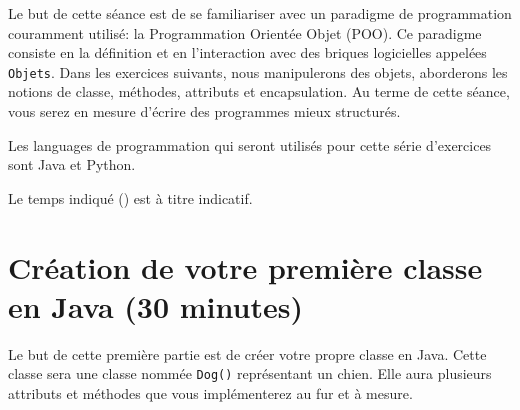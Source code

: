




\ShowSolutiontrue
\ShowConseiltrue
\titre
{}

Le but de cette séance est de se familiariser avec un paradigme de programmation couramment utilisé: la Programmation Orientée Objet (POO). Ce paradigme consiste en la définition et en l'interaction avec des briques logicielles appelées \lstinline{Objets}. Dans les exercices suivants, nous manipulerons des objets, aborderons les notions de classe, méthodes, attributs et encapsulation. Au terme de cette séance, vous serez en mesure d'écrire des programmes mieux structurés.

Les languages de programmation qui seront utilisés pour cette série d'exercices sont Java et Python.

Le temps indiqué (\faClock) est à titre indicatif.

\section{Création de votre première classe en Java (30 minutes)}

Le but de cette première partie est de créer votre propre classe en Java. Cette classe sera une classe nommée \lstinline{Dog()} représentant un chien. Elle aura plusieurs attributs et méthodes que vous implémenterez au fur et à mesure.
\\

